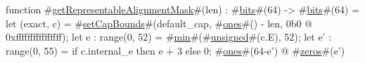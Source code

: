 function #\hyperref[sailMIPSzgetRepresentableAlignmentMask]{getRepresentableAlignmentMask}#(len) : #\hyperref[sailMIPSzbits]{bits}#(64) -> #\hyperref[sailMIPSzbits]{bits}#(64) = {
  let (exact, c) = #\hyperref[sailMIPSzsetCapBounds]{setCapBounds}#(default_cap,  #\hyperref[sailMIPSzones]{ones}#() - len, 0b0 @ 0xffffffffffffffff);
  let e : range(0, 52) = #\hyperref[sailMIPSzmin]{min}#(#\hyperref[sailMIPSzunsigned]{unsigned}#(c.E), 52);
  let e' : range(0, 55) = if c.internal_e then e + 3 else 0;
  #\hyperref[sailMIPSzones]{ones}#(64-e') @ #\hyperref[sailMIPSzzzeros]{zeros}#(e')
}
